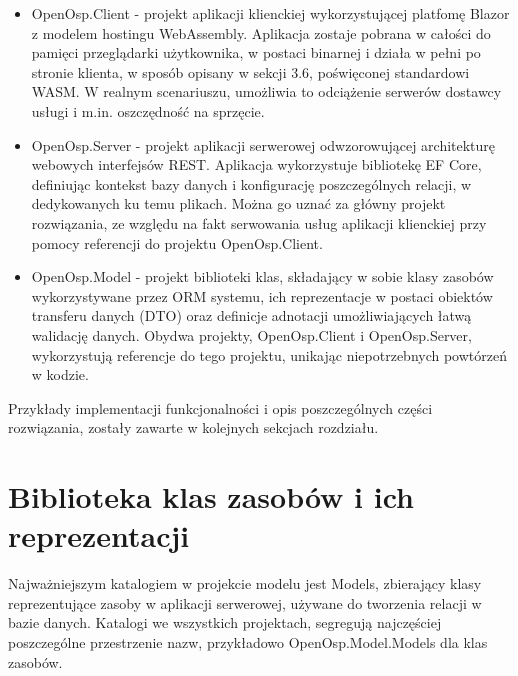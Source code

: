\begin{itemize}
    \item OpenOsp.Client - projekt aplikacji klienckiej wykorzystującej platfomę Blazor z modelem hostingu WebAssembly. Aplikacja zostaje pobrana w całości do pamięci przeglądarki użytkownika, w postaci binarnej i działa w pełni po stronie klienta, w sposób opisany w sekcji 3.6, poświęconej standardowi WASM. W realnym scenariuszu, umożliwia to odciążenie serwerów dostawcy usługi i m.in. oszczędność na sprzęcie.
    \item OpenOsp.Server - projekt aplikacji serwerowej odwzorowującej architekturę webowych interfejsów REST. Aplikacja wykorzystuje bibliotekę EF Core, definiując kontekst bazy danych i konfigurację poszczególnych relacji, w dedykowanych ku temu plikach. Można go uznać za główny projekt rozwiązania, ze względu na fakt serwowania usług aplikacji klienckiej przy pomocy referencji do projektu OpenOsp.Client.
    \item OpenOsp.Model - projekt biblioteki klas, składający w sobie klasy zasobów wykorzystywane przez ORM systemu, ich reprezentacje w postaci obiektów transferu danych (DTO) oraz definicje adnotacji umożliwiających łatwą walidację danych. Obydwa projekty, OpenOsp.Client i OpenOsp.Server, wykorzystują referencje do tego projektu, unikając niepotrzebnych powtórzeń w kodzie.
\end{itemize}

Przykłady implementacji funkcjonalności i opis poszczególnych części rozwiązania, zostały zawarte w kolejnych sekcjach rozdziału.

\section{Biblioteka klas zasobów i ich reprezentacji}

Najważniejszym katalogiem w projekcie modelu jest Models, zbierający klasy reprezentujące zasoby w aplikacji serwerowej, używane do tworzenia relacji w bazie danych. Katalogi we wszystkich projektach, segregują najczęściej poszczególne przestrzenie nazw, przykładowo OpenOsp.Model.Models dla klas zasobów.

